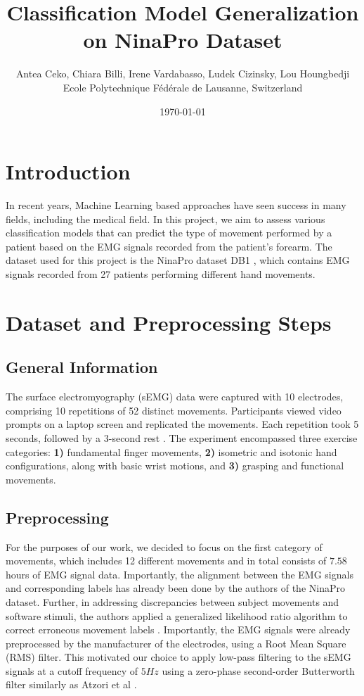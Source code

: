 \documentclass[10pt]{article}
\title{
    \vspace{-2cm}Classification Model Generalization on NinaPro Dataset
}
\author{
    \vspace{0.2cm}Antea Ceko, Chiara Billi, Irene Vardabasso, Ludek Cizinsky, Lou Houngbedji \\
    \vspace{0.2cm} \normalsize{Ecole Polytechnique Fédérale de Lausanne, Switzerland}
}
\date{\today}
\begin{document}
\maketitle

\section{Introduction}
In recent years, Machine Learning based approaches have seen success in many fields, including the medical field.
In this project, we aim to assess various classification models that can predict the type of movement performed by a patient based on the EMG signals recorded from the patient's forearm.
The dataset used for this project is the NinaPro dataset DB1 \cite{ninapro}, which contains EMG signals recorded from 27 patients performing different hand movements. 

\section{Dataset and Preprocessing Steps}
\subsection{General Information}
The surface electromyography (sEMG) data were captured with 10 electrodes, comprising 10 repetitions of 52 distinct movements. 
Participants viewed video prompts on a laptop screen and replicated the movements. Each repetition took 5 seconds, followed by a 3-second rest \cite{ninapro}.
The experiment encompassed three exercise categories: \textbf{1)} fundamental finger movements, \textbf{2)} isometric and isotonic hand configurations, along with basic wrist motions, and \textbf{3)} grasping and functional movements.


\subsection{Preprocessing}
For the purposes of our work, we decided to focus on the first category of movements, which includes 12 different movements and in total consists of $7.58$ hours of EMG signal data. 
Importantly, the alignment between the EMG signals and corresponding labels has already been done by the authors of the NinaPro dataset. Further, in addressing discrepancies between subject movements and software stimuli, 
the authors applied a generalized likelihood ratio algorithm to correct erroneous movement labels \cite{ninapro}. 
Importantly, the EMG signals were already preprocessed by the manufacturer of the electrodes,
using a Root Mean Square (RMS) filter. This motivated our choice to apply low-pass filtering to the sEMG signals at a cutoff frequency of $5 Hz$ using a zero-phase second-order Butterworth filter
similarly as Atzori et al \cite{ninapro}. 
\end{document}
